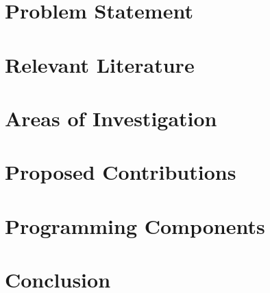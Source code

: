 \documentclass[12pt,conference]{IEEEtran}
\begin{document}
\section{Problem Statement}

\section{Relevant Literature}

\section{Areas of Investigation}

\section{Proposed Contributions}

\section{Programming Components}

\section{Conclusion}

\begin{thebibliography}{1}
\end{thebibliography}
\end{document}
